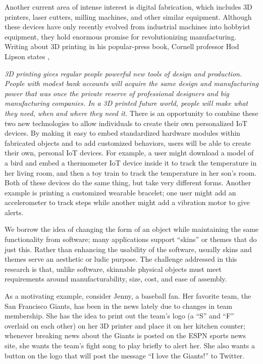 \documentclass{chi-ext}
\renewenvironment{quote}{\list{}{\leftmargin=0.1in\rightmargin=0.1in}\item[]}{\endlist}
\begin{document}
	Another current area of intense interest is digital fabrication,
	which includes 3D printers, laser cutters, milling machines, and
	other similar equipment. Although these devices have only recently
	evolved from industrial machines into hobbyist equipment, they
	hold enormous promise for revolutionizing manufacturing. Writing
	about 3D printing in his popular-press book, Cornell professor Hod
	Lipson states \cite{Lipson:2013va},
	\begin{quote}
		\textit{3D printing gives regular people powerful new tools of
			design and production. People with modest bank accounts will
			acquire the same design and manufacturing power that was once
			the private reserve of professional designers and big
			manufacturing companies. In a 3D printed future world, people
			will make what they need, when and where they need it.}
	\end{quote}
	There is an opportunity to combine these two new technologies to
	allow individuals to create their own personalized IoT devices.  By
	making it easy to embed standardized hardware modules within
	fabricated objects and to add customized behaviors, users will be
	able to create their own, personal IoT devices. For example, a user
	might download a model of a bird and embed a thermometer IoT device
	inside it to track the temperature in her living room, and then a
	toy train to track the temperature in her son's room. Both of these
	devices do the same thing, but take very different forms. Another
	example is printing a customized wearable bracelet; one user might
	add an accelerometer to track steps while another might add a
	vibration motor to give alerts.

	We borrow the idea of changing the form of an object while
	maintaining the same functionality from software; many applications
	support ``skins'' or themes that do just this. Rather than enhancing
	the usability of the software, usually skins and themes serve an
	aesthetic or ludic purpose.  The challenge addressed in this
	research is that, unlike software, skinnable physical objects must
	meet requirements around manufacturability, size, cost, and ease of
	assembly.

	As a motivating example, consider Jenny, a baseball fan. Her
	favorite team, the San Francisco Giants, has been in the news lately
	due to changes in team membership. She has the idea to print out the
	team's logo (a ``S'' and ``F'' overlaid on each other) on her 3D
	printer and place it on her kitchen counter; whenever breaking news
	about the Giants is posted on the ESPN sports news site, she wants
	the team's fight song to play briefly to alert her. She also wants a
	button on the logo that will post the message ``I love the Giants!''
	to Twitter.
\end{document}
